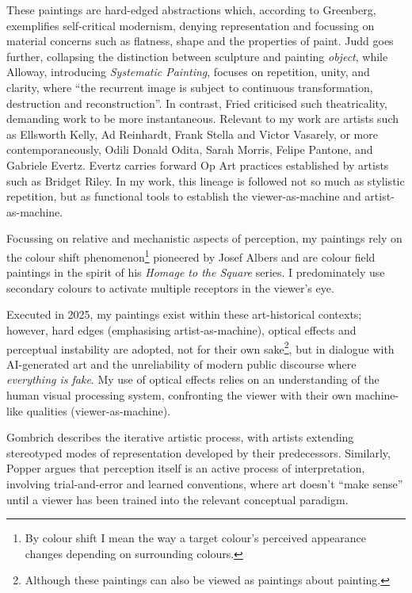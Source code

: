 \documentclass[12pt]{article}
\begin{document}
These paintings are hard-edged abstractions which, according to
Greenberg, exemplifies self-critical modernism, denying representation
and focussing on material concerns such as flatness, shape and the
properties of paint.\autocite[p.~85--93]{Greenberg1961} Judd goes further,
collapsing the distinction between sculpture and painting
\emph{object}\autocite{Judd1965}, while Alloway, introducing
\emph{Systematic Painting}, focuses on repetition, unity, and clarity,
where ``the recurrent image is subject to continuous transformation,
destruction and reconstruction''.\autocite[pp.~18--19]{Alloway1975} In
contrast, Fried criticised such theatricality, demanding work to be
more instantaneous.\autocite[pp.~12--23]{Fried1968} Relevant to my work are
artists such as Ellsworth Kelly, Ad Reinhardt, Frank Stella and Victor
Vasarely, or more contemporaneously, Odili Donald Odita, Sarah Morris,
Felipe Pantone, and Gabriele Evertz. Evertz carries forward Op Art
practices\autocite{Follin2004EmbodiedVisions,Seitz1965ResponsiveEye}
established by artists such as Bridget
Riley.\autocite{Riley2019EyesMind,Riley2019DialoguesOnArt} In my work,
this lineage is followed not so much as stylistic repetition, but as
functional tools to establish the viewer-as-machine and artist-as-machine.

Focussing on relative and mechanistic aspects of perception, my
paintings rely on the colour shift phenomenon\footnote{By colour shift
  I mean the way a target colour’s perceived appearance changes
  depending on surrounding colours.} pioneered by Josef
Albers\autocite{albers} and are colour field paintings in the spirit
of his \emph{Homage to the Square} series. I predominately use
secondary colours to activate multiple receptors in the viewer's
eye.\autocite{HurvichJameson1957,Land1977,SchnapfKraftBaylor1987}

Executed in 2025, my paintings exist within these art-historical
contexts; however, hard edges (emphasising artist-as-machine),
optical effects and perceptual instability are adopted, not for their
own sake\footnote{Although these paintings can also be viewed as
  paintings about painting.}, but in dialogue with AI-generated art
and the unreliability of modern public discourse where \emph{everything is
fake}. My use of optical effects relies on an understanding of the human
visual processing system, confronting the viewer with their own
machine-like qualities (viewer-as-machine).

Gombrich describes the iterative artistic process, with artists
extending stereotyped modes of representation developed by their
predecessors.\autocite[Chapters II, V]{gombrich1960art} Similarly, Popper
argues that perception itself is an active process of interpretation,
involving trial-and-error and learned conventions, where art doesn't
``make sense'' until a viewer has been trained into the relevant
conceptual paradigm.\autocite[Chapter 2]{popper1972objective}
\end{document}
